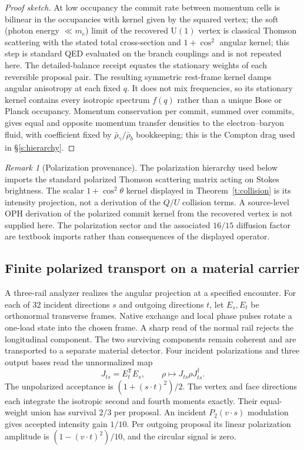 \documentclass[11pt]{article}
\theoremstyle{remark}
\newtheorem{remark}[theorem]{Remark}
\begin{document}
\begin{proof}[Proof sketch]
At low occupancy the commit rate between momentum cells is bilinear in the
occupancies with kernel given by the squared vertex; the soft
(photon energy $\ll m_e$) limit of the recovered $\mathrm U(1)$ vertex is
classical Thomson scattering with the stated total cross-section and
$1+\cos^2$ angular kernel; this step is standard QED evaluated on the branch
couplings and is not repeated here. The detailed-balance receipt equates the
stationary weights of each reversible proposal pair. The resulting symmetric
rest-frame kernel damps angular anisotropy at each fixed
$q$. It does not mix frequencies, so its stationary kernel contains every
isotropic spectrum $f(q)$ rather than a unique Bose or Planck occupancy.
Momentum conservation per commit, summed over
commits, gives equal and opposite momentum transfer densities to the
electron--baryon fluid, with coefficient fixed by
$\bar\rho_\gamma/\bar\rho_b$ bookkeeping; this is the Compton drag used in
\S\ref{s:hierarchy}.
\end{proof}

\begin{remark}[Polarization provenance]
The polarization hierarchy used below imports the standard polarized
Thomson scattering matrix acting on Stokes brightness.  The scalar
$1+\cos^2\theta$ kernel displayed in Theorem~\ref{t:collision} is its
intensity projection, not a derivation of the $Q/U$ collision terms.  A
source-level OPH derivation of the polarized commit kernel from the recovered
vertex is not supplied here. The polarization sector and the associated $16/15$
diffusion factor are textbook imports rather than consequences of the displayed
operator.
\end{remark}

\subsection{Finite polarized transport on a material carrier}
A three-rail analyzer realizes the angular projection at a specified
encounter. For each of 32 incident directions \(s\) and outgoing
directions \(t\), let \(E_s,E_t\) be orthonormal transverse frames.
Native exchange and local phase pulses rotate a one-load state into
the chosen frame. A sharp read of the normal rail rejects the
longitudinal component. The two surviving components remain coherent
and are transported to a separate material detector. Four incident
polarizations and three output bases read the unnormalized map
\[
 J_{ts}=E_t^\mathsf{T}E_s,\qquad \rho\longmapsto J_{ts}\rho J_{ts}^\dagger .
\]
The unpolarized acceptance is \((1+(s\cdot t)^2)/2\). The vertex and
face directions each integrate the isotropic second and fourth moments
exactly. Their equal-weight union has survival \(2/3\) per proposal.
An incident \(P_2(v\cdot s)\) modulation gives accepted intensity gain
\(1/10\). Per outgoing proposal its linear polarization amplitude is
\((1-(v\cdot t)^2)/10\), and the circular signal is zero.
\end{document}
